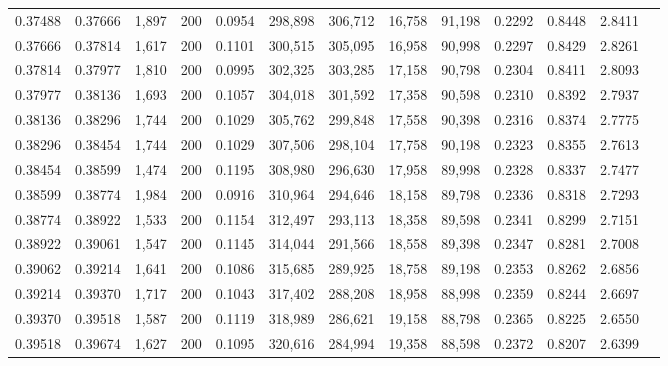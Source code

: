 \begin{tabular}{rrrrrrrrrrrrr}
0.37488 & 0.37666 &  1,897 & 200 &                                     0.0954 & 298,898 & 306,712 &  16,758 &  91,198 & 0.2292 & 0.8448 & 2.8411 \\
0.37666 & 0.37814 &  1,617 & 200 &                                     0.1101 & 300,515 & 305,095 &  16,958 &  90,998 & 0.2297 & 0.8429 & 2.8261 \\
0.37814 & 0.37977 &  1,810 & 200 &                                     0.0995 & 302,325 & 303,285 &  17,158 &  90,798 & 0.2304 & 0.8411 & 2.8093 \\
0.37977 & 0.38136 &  1,693 & 200 &                                     0.1057 & 304,018 & 301,592 &  17,358 &  90,598 & 0.2310 & 0.8392 & 2.7937 \\
0.38136 & 0.38296 &  1,744 & 200 &                                     0.1029 & 305,762 & 299,848 &  17,558 &  90,398 & 0.2316 & 0.8374 & 2.7775 \\
0.38296 & 0.38454 &  1,744 & 200 &                                     0.1029 & 307,506 & 298,104 &  17,758 &  90,198 & 0.2323 & 0.8355 & 2.7613 \\
0.38454 & 0.38599 &  1,474 & 200 &                                     0.1195 & 308,980 & 296,630 &  17,958 &  89,998 & 0.2328 & 0.8337 & 2.7477 \\
0.38599 & 0.38774 &  1,984 & 200 &                                     0.0916 & 310,964 & 294,646 &  18,158 &  89,798 & 0.2336 & 0.8318 & 2.7293 \\
0.38774 & 0.38922 &  1,533 & 200 &                                     0.1154 & 312,497 & 293,113 &  18,358 &  89,598 & 0.2341 & 0.8299 & 2.7151 \\
0.38922 & 0.39061 &  1,547 & 200 &                                     0.1145 & 314,044 & 291,566 &  18,558 &  89,398 & 0.2347 & 0.8281 & 2.7008 \\
0.39062 & 0.39214 &  1,641 & 200 &                                     0.1086 & 315,685 & 289,925 &  18,758 &  89,198 & 0.2353 & 0.8262 & 2.6856 \\
0.39214 & 0.39370 &  1,717 & 200 &                                     0.1043 & 317,402 & 288,208 &  18,958 &  88,998 & 0.2359 & 0.8244 & 2.6697 \\
0.39370 & 0.39518 &  1,587 & 200 &                                     0.1119 & 318,989 & 286,621 &  19,158 &  88,798 & 0.2365 & 0.8225 & 2.6550 \\
0.39518 & 0.39674 &  1,627 & 200 &                                     0.1095 & 320,616 & 284,994 &  19,358 &  88,598 & 0.2372 & 0.8207 & 2.6399 \\

\end{tabular}
